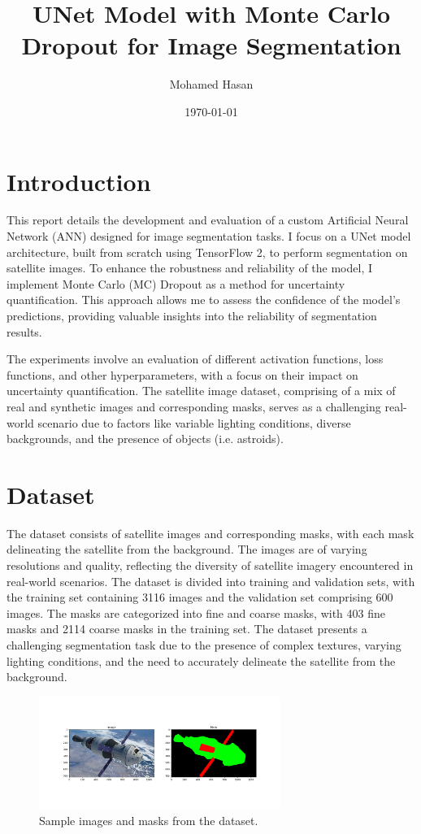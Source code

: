 \documentclass{article}
\title{UNet Model with Monte Carlo Dropout for Image Segmentation}
\author{Mohamed Hasan}
\date{\today}
\begin{document}
\maketitle

\section{Introduction}
This report details the development and evaluation of a custom Artificial Neural Network (ANN) 
designed for image segmentation tasks. I focus on a UNet model architecture, built from scratch 
using TensorFlow 2, to perform segmentation on satellite images. To enhance the robustness and 
reliability of the model, I implement Monte Carlo (MC) Dropout as a method for uncertainty quantification. 
This approach allows me to assess the confidence of the model’s predictions, providing valuable 
insights into the reliability of segmentation results.

The experiments involve an evaluation of different activation functions, loss functions, and 
other hyperparameters, with a focus on their impact on uncertainty quantification. The satellite 
image dataset, comprising of a mix of real and synthetic images and corresponding masks, serves as 
a challenging real-world scenario due to factors like variable lighting conditions, diverse backgrounds, 
and the presence of objects (i.e. astroids).


\section{Dataset}
The dataset consists of satellite images and corresponding masks, with each mask delineating the
satellite from the background. The images are of varying resolutions and quality, reflecting the
diversity of satellite imagery encountered in real-world scenarios. The dataset is divided into
training and validation sets, with the training set containing 3116 images and the validation set
comprising 600 images. The masks are categorized into fine and coarse masks, with 403 fine masks
and 2114 coarse masks in the training set. The dataset presents a challenging segmentation task due
to the presence of complex textures, varying lighting conditions, and the need to accurately
delineate the satellite from the background.

\begin{figure}[h]
    \centering
    \includegraphics[width=0.7\textwidth]{../images/original_input_sample.png}
    \caption{Sample images and masks from the dataset.}
    \label{fig:dataset}
\end{figure}
\end{document}

